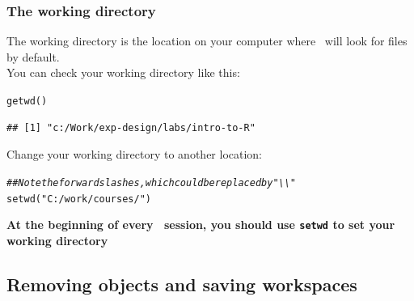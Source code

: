 \documentclass[color=usenames,dvipsnames]{beamer}\usepackage[]{graphicx}\usepackage[]{color}
\makeatletter
\newcommand{\hlstr}[1]{\textcolor[rgb]{0.749,0.012,0.012}{#1}}%
\newcommand{\hlcom}[1]{\textcolor[rgb]{0.514,0.506,0.514}{\textit{#1}}}%
\newcommand{\hlstd}[1]{\textcolor[rgb]{0,0,0}{#1}}%
\newcommand{\hlkwd}[1]{\textcolor[rgb]{0.004,0.004,0.506}{#1}}%
\newenvironment{kframe}{%
 \def\at@end@of@kframe{}%
 \ifinner\ifhmode%
  \def\at@end@of@kframe{\end{minipage}}%
  \begin{minipage}{\columnwidth}%
 \fi\fi%
 \def\FrameCommand##1{\hskip\@totalleftmargin \hskip-\fboxsep
 \colorbox{shadecolor}{##1}\hskip-\fboxsep
     \hskip-\linewidth \hskip-\@totalleftmargin \hskip\columnwidth}%
 \MakeFramed {\advance\hsize-\width
   \@totalleftmargin\z@ \linewidth\hsize
   \@setminipage}}%
 {\par\unskip\endMakeFramed%
 \at@end@of@kframe}
\newenvironment{knitrout}{}{} %
\newcommand{\inr}[1]{\colorbox{inlinecolor}{\texttt{#1}}}
\makeatother
\begin{document}
\begin{frame}[fragile]
  \frametitle{The working directory}
The working directory is the location on your computer where \R~will
look for files by default. \\
\pause \vfill
You can check your working directory like this:
\begin{knitrout}\small
{}\color{fgcolor}\begin{kframe}
\begin{alltt}
\hlkwd{getwd}\hlstd{()}
\end{alltt}
\begin{verbatim}
## [1] "c:/Work/exp-design/labs/intro-to-R"
\end{verbatim}
\end{kframe}
\end{knitrout}
\pause \vfill
Change your working directory to another location:
\begin{knitrout}\small
{}\color{fgcolor}\begin{kframe}
\begin{alltt}
\hlcom{## Note the forward slashes, which could be replaced by "\textbackslash{}\textbackslash{}"}
\hlkwd{setwd}\hlstd{(}\hlstr{"C:/work/courses/"}\hlstd{)}
\end{alltt}
\end{kframe}
\end{knitrout}
\pause \vfill
\centering
{\bf At the beginning of every \R~session, you should use
  \inr{setwd} to set your working directory \\}
\end{frame}








\subsection{Removing objects and saving workspaces}
\end{document}

